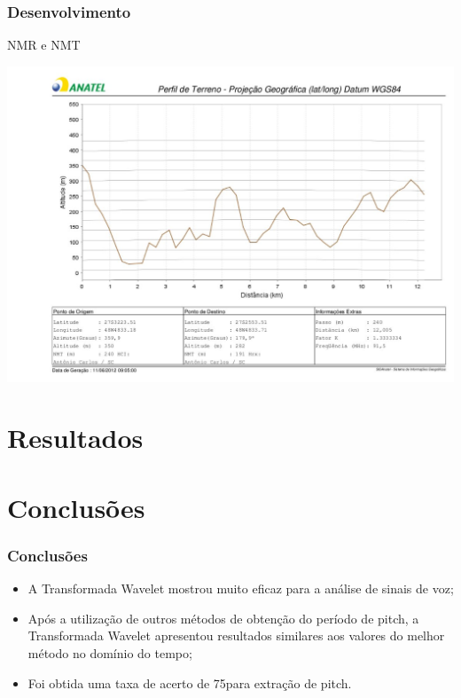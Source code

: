 \documentclass{beamer}
\begin{document}
     \begin{frame}
    
      \frametitle{Desenvolvimento}
      NMR e NMT
      \begin{center}
      
           \includegraphics[width=.8\linewidth]{figs/nmt1_v2.jpg}		  		
        \end{center}
  
      \end{frame}
    
    
    

    
    
    \section{Resultados}

    \section{Conclusões}
    \begin{frame}
    \frametitle{Conclusões}
    \begin{itemize}
    \item A Transformada Wavelet mostrou muito eficaz para a análise de sinais de
    voz;
    \item Após a utilização de outros métodos de obtenção do período de pitch, a
    Transformada Wavelet apresentou resultados similares aos valores do melhor
    método no domínio do tempo;
    \item Foi obtida uma taxa de acerto de 75\textdiscount para extração de pitch.
    \end{itemize}

    \end{frame}
\end{document}

